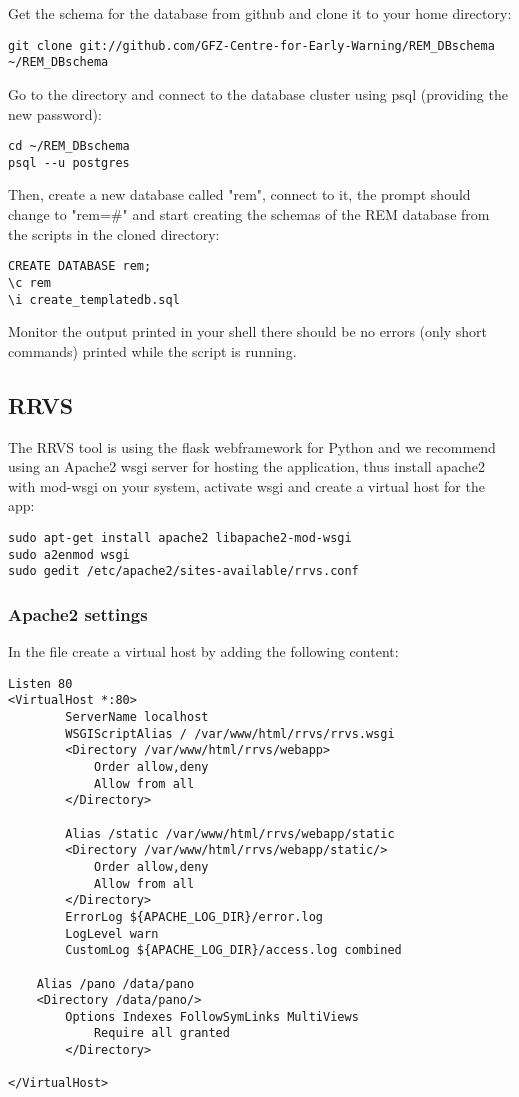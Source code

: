 \documentclass{article}
\begin{document}
Get the schema for the database from github and clone it to your home directory:
\begin{verbatim}
git clone git://github.com/GFZ-Centre-for-Early-Warning/REM_DBschema ~/REM_DBschema
\end{verbatim}

Go to the directory and connect to the database cluster using psql (providing the new password):
\begin{verbatim}
cd ~/REM_DBschema
psql --u postgres
\end{verbatim}

Then, create a new database called "rem", connect to it, the prompt
should change to "rem=\#" and
start creating the schemas of the REM database from the scripts 
in the cloned directory:
\begin{verbatim}
CREATE DATABASE rem;
\c rem
\i create_templatedb.sql
\end{verbatim}
Monitor the output printed in your shell there should be no errors
(only short commands) printed while the script is running.

\subsection{RRVS}
The RRVS tool is using the flask webframework for Python and we 
recommend using an Apache2 wsgi server for hosting the application,
thus install apache2 with mod-wsgi on your system, activate wsgi
and create a virtual host for the app:
\begin{verbatim}
sudo apt-get install apache2 libapache2-mod-wsgi
sudo a2enmod wsgi
sudo gedit /etc/apache2/sites-available/rrvs.conf
\end{verbatim}

\subsubsection{Apache2 settings}
In the file create a virtual host by adding the following content:
\begin{verbatim}
Listen 80  
<VirtualHost *:80>  
        ServerName localhost  
        WSGIScriptAlias / /var/www/html/rrvs/rrvs.wsgi  
        <Directory /var/www/html/rrvs/webapp>  
            Order allow,deny  
            Allow from all  
        </Directory>
  
        Alias /static /var/www/html/rrvs/webapp/static  
        <Directory /var/www/html/rrvs/webapp/static/>  
            Order allow,deny  
            Allow from all  
        </Directory>  
        ErrorLog ${APACHE_LOG_DIR}/error.log  
        LogLevel warn  
        CustomLog ${APACHE_LOG_DIR}/access.log combined  
	
	Alias /pano /data/pano                           
	<Directory /data/pano/>       
 	    Options Indexes FollowSymLinks MultiViews
     	    Require all granted
        </Directory>

</VirtualHost>
\end{verbatim}
\end{document}
